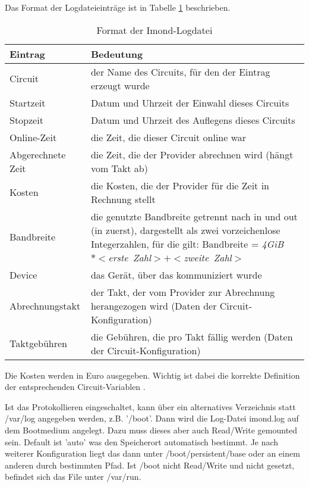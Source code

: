 \begin{description}
{      Das Format der Logdateieinträge ist in Tabelle \ref{tab:imondlog}
      beschrieben.
      \begin{table}[htbp]
        \small
        \centering
        \caption{Format der Imond-Logdatei}\label{tab:imondlog}
        \begin{tabular}{lp{12cm}}
          \hline
          Eintrag & Bedeutung \\
          \hline
          Circuit & der Name des Circuits, für den der Eintrag erzeugt
          wurde \\
          Startzeit & Datum und Uhrzeit der Einwahl dieses Circuits \\
          Stopzeit & Datum und Uhrzeit des Auflegens dieses Circuits \\
          Online-Zeit & die Zeit, die dieser Circuit online war \\
          Abgerechnete Zeit & die Zeit, die der Provider abrechnen wird
          (hängt vom Takt ab) \\
          Kosten & die Kosten, die der Provider für die Zeit in Rechnung
          stellt \\
          Bandbreite & die genutzte Bandbreite getrennt nach in und out
          (in zuerst), dargestellt als zwei vorzeichenlose
          Integerzahlen, für die gilt: Bandbreite =\newline
          \emph{4GiB~$*<$erste~Zahl$>+<$zweite~Zahl$>$} \\
          Device & das Gerät, über das kommuniziert wurde \\
          Abrechnungstakt & der Takt, der vom Provider zur
          Abrechnung herangezogen wird (Daten der Circuit-Konfiguration)\\
          Taktgebühren & die Gebühren, die pro Takt fällig werden
          (Daten der Circuit-Konfiguration)\\
          \hline
        \end{tabular}
      \end{table}

      Die Kosten werden in Euro ausgegeben. Wichtig ist dabei die
      korrekte Definition der entsprechenden Circuit-Variablen
      .
      }


    {Ist das Protokollieren eingeschaltet, kann über  ein
      alternatives Verzeichnis statt /var/log angegeben werden, z.B.
      '/boot'. Dann wird die Log-Datei imond.log auf dem Bootmedium
      angelegt. Dazu muss dieses aber auch Read/Write
      \glqq{}gemounted\grqq{} sein. Default ist 'auto' was den Speicherort automatisch
      bestimmt. Je nach weiterer Konfiguration liegt das dann unter /boot/persistent/base
      oder an einem anderen durch  bestimmten Pfad. Ist /boot nicht Read/Write
      und  nicht gesetzt, befindet sich das File unter /var/run.}


\end{description}
